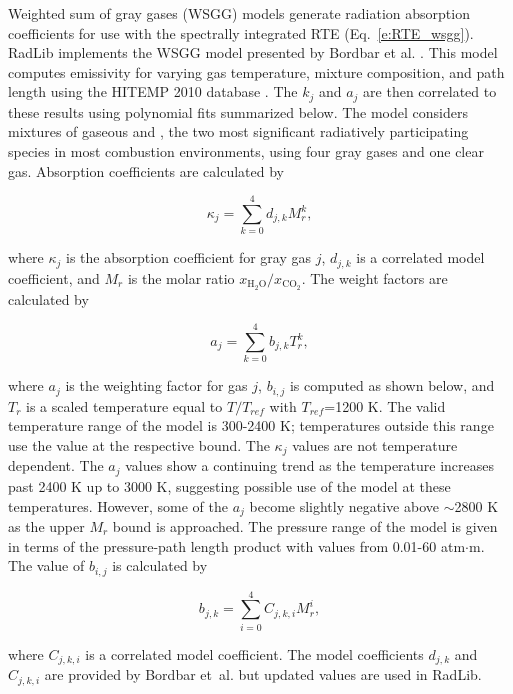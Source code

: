 \documentclass[preprint,12pt]{elsarticle}
\begin{document}
Weighted sum of gray gases (WSGG) models generate radiation absorption coefficients for use with the spectrally integrated RTE (Eq.~\ref{e:RTE_wsgg}).
RadLib implements the WSGG model presented by Bordbar et al. \citep{Bordbar_2014,Bordbar_2020}. This model computes emissivity for varying gas temperature, mixture composition, and path length using the HITEMP 2010 database \cite{Rothman_2010}. The $k_j$ and $a_j$ are then correlated to these results using polynomial fits summarized below. The model considers mixtures of gaseous  and , the two most significant radiatively participating species in most combustion environments, using four gray gases and one clear gas. Absorption coefficients are calculated by
%
\begin{linenomath}
\begin{equation}
    \kappa_j=\sum_{k=0}^{4}d_{j,k}M_r^k,
\end{equation}
\end{linenomath}
%
where $\kappa_j$ is the absorption coefficient for gray gas $j$, $d_{j,k}$ is a correlated model coefficient, and $M_r$ is the molar ratio $x_{\mathrm{H_2O}}/x_{\mathrm{CO_2}}$. The weight factors are calculated by
%
\begin{linenomath}
\begin{equation}
    a_j=\sum_{k=0}^{4}b_{j,k}T_r^k,
\end{equation}
\end{linenomath}
%
where $a_j$ is the weighting factor for gas $j$, $b_{i,j}$ is computed as shown below,  and $T_r$ is a scaled temperature equal to $T/T_{ref}$ with $T_{ref}$=1200 K. The valid temperature range of the model is 300-2400 K; temperatures outside this range use the value at the respective bound. The $\kappa_j$ values are not temperature dependent. The $a_j$ values show a continuing trend as the temperature increases past 2400 K up to 3000 K, suggesting possible use of the model at these temperatures. However, some of the $a_j$ become slightly negative above $\sim$2800 K as the upper $M_r$ bound is approached. The pressure range of the model is given in terms of the pressure-path length product with values from 0.01-60 atm$\cdot$m. The value of $b_{i,j}$ is calculated by
%
\begin{linenomath}
\begin{equation}
    b_{j,k}=\sum_{i=0}^{4}C_{j,k,i}M_r^i,
\end{equation}
\end{linenomath}
%
where $C_{j,k,i}$ is a correlated model coefficient. The model coefficients $d_{j,k}$ and $C_{j,k,i}$ are provided by Bordbar et~al. \citep{Bordbar_2014,Bordbar_2020} but updated values are used in RadLib.
\end{document}
